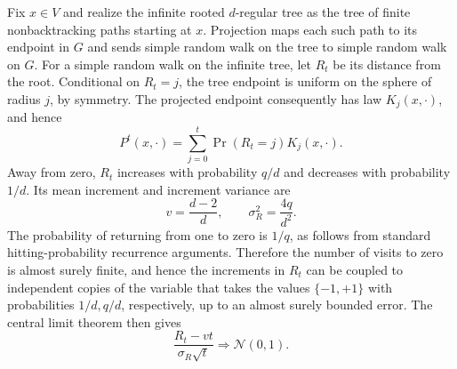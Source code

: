 \documentclass[11pt,reqno]{amsart}
\theoremstyle{definition}
\begin{document}
Fix $x\in V$ and realize the infinite rooted $d$-regular tree as
the tree of finite nonbacktracking paths starting at $x$. Projection
maps each such path to its endpoint in $G$ and sends simple random
walk on the tree to simple random walk on $G$. For a simple random walk on the infinite tree, let $R_t$ be its distance from the root. Conditional on $R_t=j$,
the tree endpoint is uniform on the sphere of radius $j$, by
symmetry. The projected endpoint consequently has law $K_j(x,\cdot)$,
and hence
\begin{equation}\label{eq:treemixture}
 P^t(x,\cdot)=\sum_{j=0}^t\Pr(R_t=j)K_j(x,\cdot).
\end{equation}
Away from zero, $R_t$ increases with probability $q/d$ and decreases
with probability $1/d$. Its mean increment and increment variance are
\[
 v=\frac{d-2}{d},\qquad \sigma_R^2=\frac{4q}{d^2}.
\]
The probability of returning from one to zero is $1/q$, as follows
from standard hitting-probability recurrence arguments. Therefore the number
of visits to zero is almost surely finite, and hence the increments in $R_t$ can be coupled to independent copies of the variable that takes the values $\{-1,+1\}$ with probabilities $1/d,q/d$, respectively, up to an almost surely bounded error. The central limit theorem then gives
\begin{equation}\label{eq:radialclt}
 \frac{R_t-vt}{\sigma_R\sqrt t}\Longrightarrow\mathcal N(0,1).
\end{equation}
\end{document}
